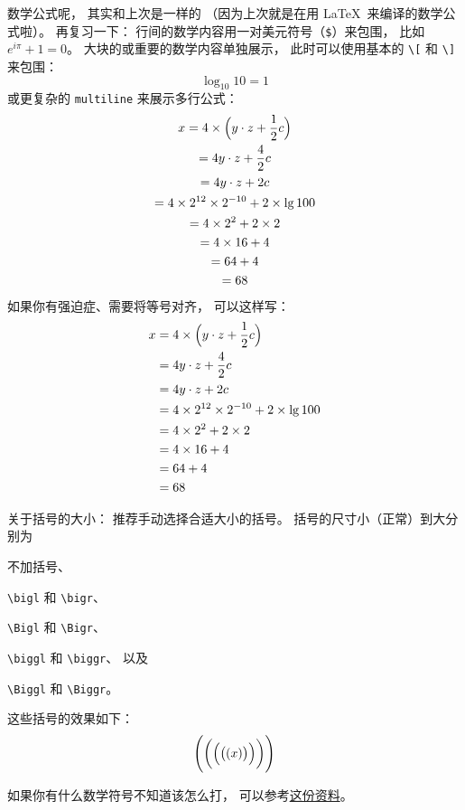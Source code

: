 \documentclass{article}
\renewenvironment{itemize}{%
    \begin{compactitem}
}{%
    \end{compactitem}
}
\def\code{\lstinline}
\begin{document}
数学公式呢，
其实和上次是一样的
（因为上次就是在用 \LaTeX\ 来编译的数学公式啦）。
再复习一下：
行间的数学内容用一对美元符号（\code`$`）来包围，
比如 $e^{i\pi} + 1 = 0$。
大块的或重要的数学内容单独展示，
此时可以使用基本的 \code`\[` 和 \code`\]` 来包围：
\[
    \log_{10} 10 = 1
\]
或更复杂的 \code `multiline` 来展示多行公式：
\begin{multline*}
    x = 4 \times \Bigl( y \cdot z + \frac{1}{2} c \Bigr) \\
      = 4 y \cdot z + \frac{4}{2} c \\
      = 4 y \cdot z + 2 c \\
      = 4 \times 2^{12} \times 2^{-10} + 2 \times \lg 100 \\
      = 4 \times 2^2 + 2 \times 2 \\
      = 4 \times 16 + 4 \\
      = 64 + 4 \\
      = 68
\end{multline*}
如果你有强迫症、需要将等号对齐，
可以这样写：
\[
    \begin{split}
        x &= 4 \times \Bigl( y \cdot z + \frac{1}{2} c \Bigr) \\
          &= 4 y \cdot z + \frac{4}{2} c \\
          &= 4 y \cdot z + 2 c \\
          &= 4 \times 2^{12} \times 2^{-10} + 2 \times \lg 100 \\
          &= 4 \times 2^2 + 2 \times 2 \\
          &= 4 \times 16 + 4 \\
          &= 64 + 4 \\
          &= 68
    \end{split}
\]

关于括号的大小：
推荐手动选择合适大小的括号。
括号的尺寸小（正常）到大分别为
\begin{itemize}
\item
    不加括号、
\item
    \code`\bigl` 和 \code`\bigr`、
\item
    \code`\Bigl` 和 \code`\Bigr`、
\item
    \code`\biggl` 和 \code`\biggr`、
    以及
\item
    \code`\Biggl` 和 \code`\Biggr`。
\end{itemize}
这些括号的效果如下：
\[
    \Biggl(\biggl(\Bigl(\bigl((x)\bigr)\Bigr)\biggr)\Biggr)
\]

如果你有什么数学符号不知道该怎么打，
可以参考\href{http://web.mit.edu/rsi/www/pdfs/math-symbols.pdf}{这份资料}。
\end{document}
